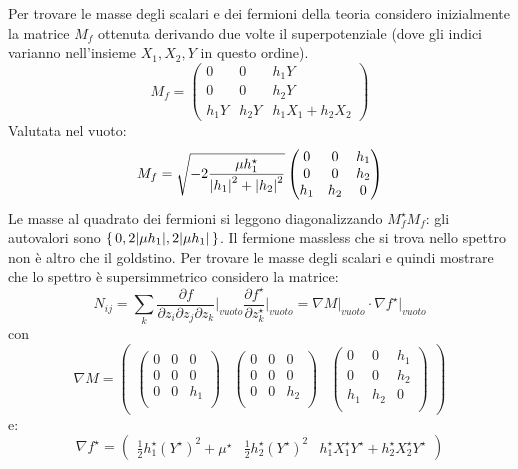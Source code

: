 \documentclass[]{scrartcl}
\begin{document}
Per trovare le masse degli scalari e dei fermioni della teoria considero inizialmente la matrice $ M_f $ ottenuta derivando due volte il superpotenziale
(dove gli indici varianno nell'insieme $ X_1, X_2, Y$ in questo ordine).
\[
  M_f =
  \begin{pmatrix}
    0    & 0    & h_1Y \\
    0    & 0    & h_2Y \\
    h_1Y & h_2Y & h_1 X_1 + h_2 X_2
  \end{pmatrix}
\]
Valutata nel vuoto:
\[
  M_{f} = \sqrt{-2\frac{\mu h_1^\star}{\abs{h_1}^2 + \abs{h_2}^2}}
  \begin{pmatrix}
    0    & 0    & h_1\\
    0    & 0    & h_2\\
    h_1& h_2& 0
  \end{pmatrix}
\]
Le masse al quadrato dei fermioni si leggono diagonalizzando $ M_{f}^\star M_{f} $: gli autovalori sono $ \set{0, 2 \abs{\mu h_1}, 2 \abs{\mu h_1} } $.
Il fermione massless che si trova nello spettro non è altro che il goldstino.
Per trovare le masse degli scalari e quindi mostrare che lo spettro è supersimmetrico considero la matrice:
\[
  N_{ij} = \sum_k \frac{\partial f}{\partial z_i\partial z_j\partial z_k}\biggr\rvert_{vuoto}\frac{\partial f^\star}{\partial z_k^\star}\biggr\rvert_{vuoto}
  = \nabla M \biggr\rvert_{vuoto} \cdot \nabla f^\star\biggr\rvert_{vuoto}
\]
con
\[
  \nabla M =
  \begin{pmatrix}
    \begin{pmatrix}
      0       & 0   & 0   \\
      0       & 0   & 0   \\
      0       & 0   & h_1 \\
    \end{pmatrix}
              &
    \begin{pmatrix}
      0       & 0   & 0   \\
      0       & 0   & 0   \\
      0       & 0   & h_2 \\
    \end{pmatrix}
              &
    \begin{pmatrix}
      0       & 0   & h_1 \\
      0       & 0   & h_2 \\
      h_1     & h_2 & 0   \\
    \end{pmatrix}
  \end{pmatrix}
\]
e:
\[
  \nabla f^\star =
  \begin{pmatrix}
    \frac{1}{2}h_1^\star (Y^\star)^2 + \mu^\star &
    \frac{1}{2}h_2^\star (Y^\star)^2 &
    h_1^\star X_1^\star Y^\star + h_2^\star X_2^\star Y^\star
  \end{pmatrix}
\]
\end{document}
